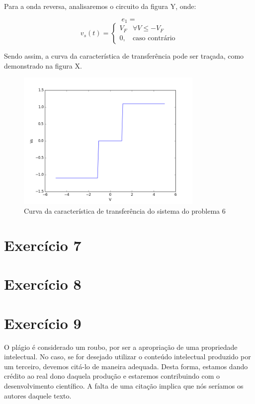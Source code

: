\documentclass[12pt, a4paper, twoside]{article}
\begin{document}
Para a onda reversa, analisaremos o circuito da figura Y, onde:


$$ e_1 =  $$
\begin{equation}
    v_s(t) =
    \begin{cases}
        V_F & \forall V \leq -V_F \\
        0, & \text{caso contrário}
    \end{cases}
\end{equation}

Sendo assim, a curva da característica de transferência pode ser traçada, como
demonstrado na figura X.
\begin{figure}
    \centering
    \includegraphics[width=0.8\textwidth]{figs/rel3/ex6.png}
    \caption{Curva da característica de transferência do sistema do problema 6}
\end{figure}

\section{Exercício 7}

\section{Exercício 8}

\section{Exercício 9}

O plágio é considerado um roubo, por ser a apropriação de uma propriedade intelectual.
No caso, se for desejado utilizar o conteúdo intelectual produzido por um terceiro,
devemos citá-lo de maneira adequada. Desta forma, estamos dando crédito ao real dono
daquela produção e estaremos contribuindo com o desenvolvimento científico. A falta de
uma citação implica que nós seríamos os autores daquele texto.
\end{document}
